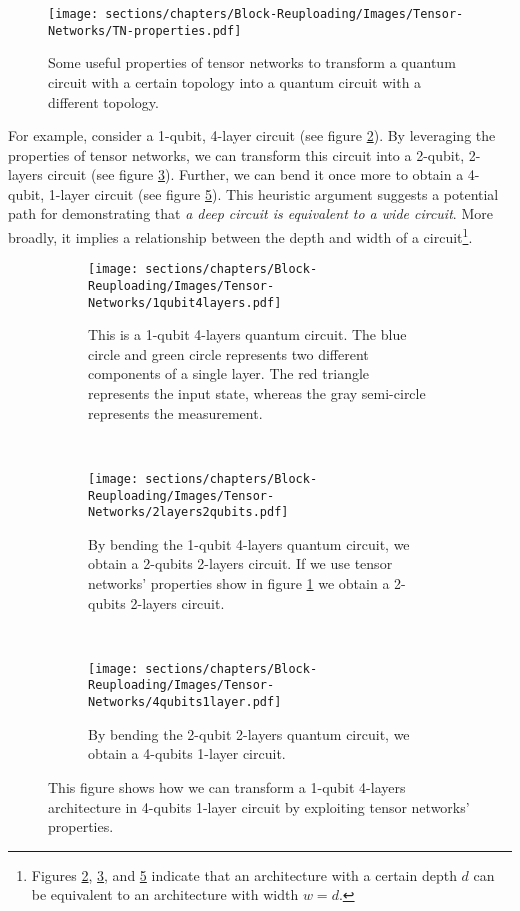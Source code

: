 \begin{itemize}
    \begin{figure}[h]
        \centering
        \texttt{[image: sections/chapters/Block-Reuploading/Images/Tensor-Networks/TN-properties.pdf]}
        \caption{Some useful properties of tensor networks to transform a quantum circuit with a certain 
        topology into a quantum circuit with a different topology.}
        \label{fig:tensor-prop}
    \end{figure}

    For example, consider a 1-qubit, 4-layer circuit (see figure \ref{fig:1q-4l}). By leveraging 
    the properties of tensor networks, we can transform this circuit into a 2-qubit, 2-layers circuit 
    (see figure \ref{fig:2q-2l}). Further, we can bend it once more to obtain a 4-qubit, 
    1-layer circuit (see figure \ref{fig:4q-1l}). This heuristic argument suggests a potential path 
    for demonstrating that \textit{a deep circuit is equivalent to a wide circuit}. 
    More broadly, it implies a relationship between the depth and width of a 
    circuit\footnote[1]{Figures \ref{fig:1q-4l}, \ref{fig:2q-2l}, and \ref{fig:4q-1l} indicate 
    that an architecture with a certain depth $d$ can be equivalent to an architecture with width 
    $w = d$.}.\\

    \begin{figure}[h]
        \centering
        \begin{subfigure}[b]{\textwidth}
            \texttt{[image: sections/chapters/Block-Reuploading/Images/Tensor-Networks/1qubit4layers.pdf]}
        \caption{This is a 1-qubit 4-layers quantum circuit. The blue circle and green circle represents two
        different components of a single layer. The red triangle represents the input state, whereas the 
        gray semi-circle represents the measurement.}
        \label{fig:1q-4l}
        \end{subfigure}
        \\[3ex]
        \begin{subfigure}[b]{\textwidth}
        \centering
            \texttt{[image: sections/chapters/Block-Reuploading/Images/Tensor-Networks/2layers2qubits.pdf]}
        \caption{By bending the 1-qubit 4-layers quantum circuit, we obtain a 2-qubits 2-layers circuit. If 
        we use tensor networks' properties show in figure \ref{fig:tensor-prop} we obtain a 2-qubits 
        2-layers circuit.}
        \label{fig:2q-2l}
        \end{subfigure}
        \\[3ex]
        \begin{subfigure}[b]{\textwidth}
        \centering
            \texttt{[image: sections/chapters/Block-Reuploading/Images/Tensor-Networks/4qubits1layer.pdf]}
        \caption{By bending the 2-qubit 2-layers quantum circuit, we obtain a 4-qubits 1-layer circuit.}
        \label{fig:4q-1l}
        \end{subfigure}
        \caption{This figure shows how we can transform a 1-qubit 4-layers architecture in 4-qubits 1-layer 
        circuit by exploiting tensor networks' properties.}
    \end{figure}


\end{itemize}
